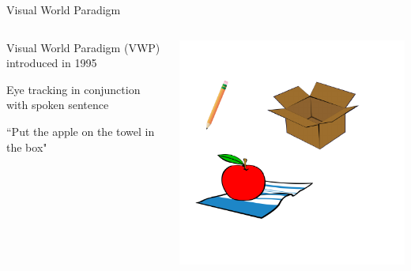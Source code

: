 \documentclass{beamer}
\begin{document}
\begin{frame}{Visual World Paradigm}\large
\begin{columns}
\begin{column}{0.45\textwidth}

Visual World Paradigm (VWP) introduced in 1995 \vspace{4mm}

Eye tracking in conjunction with spoken sentence  \vspace{4mm}

``Put the apple on the towel in the box" 


\end{column}
\begin{column}{0.5\textwidth}  %
\begin{center}
\includegraphics[scale=.9]{img/towel_apple_box.pdf}
\end{center}
\end{column}
\end{columns}
\end{frame}

\end{document}
